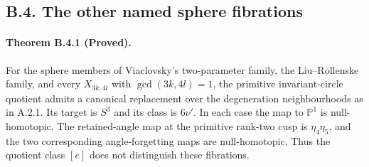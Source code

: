 \subsection{B.4. The other named sphere fibrations}

\paragraph{Theorem B.4.1 (Proved).}
For the sphere members of Viaclovsky's two-parameter family,
the Liu--Rollenske family, and every $X_{3k,4l}$ with
$\gcd(3k,4l)=1$, the primitive invariant-circle quotient
admits a canonical replacement over the degeneration
neighbourhoods as in A.2.1.  Its target is $S^3$ and
its class is $6\nu'$.  In each case the map to
$\mathbb P^1$ is null-homotopic.  The retained-angle
map at the primitive rank-two cusp is $\eta_4\eta_5$,
and the two corresponding angle-forgetting maps are
null-homotopic.  Thus the quotient class $[e]$ does
not distinguish these fibrations.


